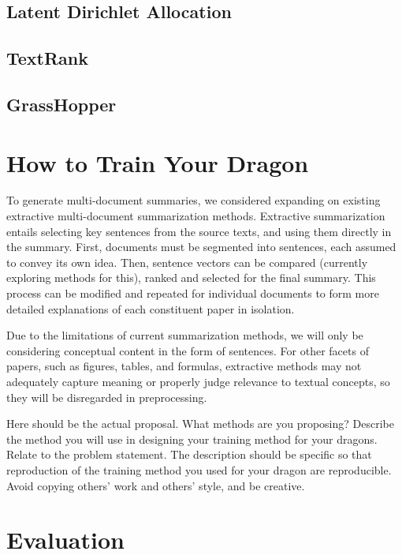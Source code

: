 \documentclass[conference]{sig-alternate-05-2015}
\begin{document}
\subsection{Latent Dirichlet Allocation}

\subsection{TextRank}

\subsection{GrassHopper}

\section{How to Train Your Dragon}\label{sec:design}

To generate multi-document summaries, we considered expanding on existing extractive multi-document summarization 
methods. Extractive summarization entails selecting key sentences from the source texts, and using them directly in the 
summary. First, documents must be segmented into sentences, each assumed to convey its own idea. Then, sentence vectors can be 
compared (currently exploring methods for this), ranked and selected for the final summary. This process can be modified 
and repeated for individual documents to form more detailed explanations of each constituent paper in isolation.

Due to the limitations of current summarization methods, we will only be considering 
conceptual content in the form of sentences. For other facets of papers, such as figures, tables, and formulas, extractive 
methods may not adequately capture meaning or properly judge relevance to textual concepts, so they will be 
disregarded in preprocessing.

Here should be the actual proposal. What methods are you proposing? Describe the method you will use in designing your training method for your dragons. Relate to the problem statement. The description should be specific so that reproduction of the training method you used for your dragon are reproducible. Avoid copying others' work and others' style, and be creative. 

\section{Evaluation}\label{sec:evaluation}
\end{document}
